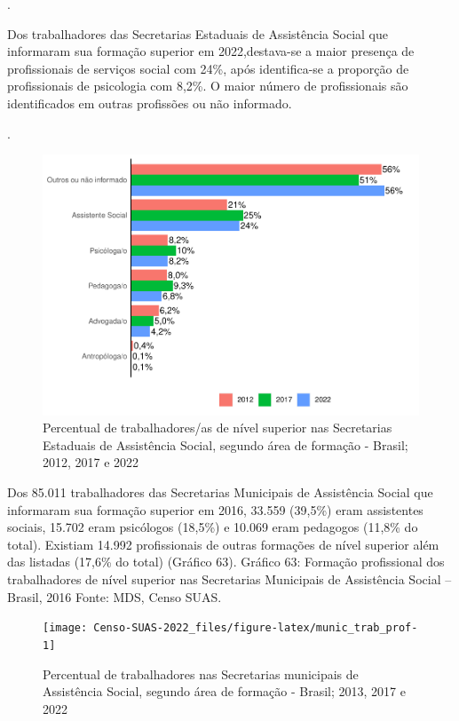 \documentclass[
  brazilian]{report}
\begin{document}
.

Dos trabalhadores das Secretarias Estaduais de Assistência Social que
informaram sua formação superior em 2022,destava-se a maior presença de
profissionais de serviços social com 24\%, após identifica-se a
proporção de profissionais de psicologia com 8,2\%. O maior número de
profissionais são identificados em outras profissões ou não informado.

.

\begin{figure}
\includegraphics{Censo-SUAS-2022_files/figure-latex/uf_trab_prof-1} \caption[Percentual de trabalhadores/as de nível superior nas Secretarias Estaduais de Assistência Social, segundo área de formação - Brasil]{Percentual de trabalhadores/as de nível superior nas Secretarias Estaduais de Assistência Social, segundo área de formação - Brasil; 2012, 2017 e 2022}\label{fig:uf_trab_prof}
\end{figure}

Dos 85.011 trabalhadores das Secretarias Municipais de Assistência
Social que informaram sua formação superior em 2016, 33.559 (39,5\%)
eram assistentes sociais, 15.702 eram psicólogos (18,5\%) e 10.069 eram
pedagogos (11,8\% do total). Existiam 14.992 profissionais de outras
formações de nível superior além das listadas (17,6\% do total) (Gráfico
63). Gráfico 63: Formação profissional dos trabalhadores de nível
superior nas Secretarias Municipais de Assistência Social -- Brasil,
2016 Fonte: MDS, Censo SUAS.

\begin{figure}
\texttt{[image: Censo-SUAS-2022\_files/figure-latex/munic\_trab\_prof-1]} \caption[Percentual de trabalhadores nas Secretarias municipais de Assistência Social, segundo área de formação - Brasil]{Percentual de trabalhadores nas Secretarias municipais de Assistência Social, segundo área de formação - Brasil; 2013, 2017 e 2022}\label{fig:munic_trab_prof}
\end{figure}
\end{document}
